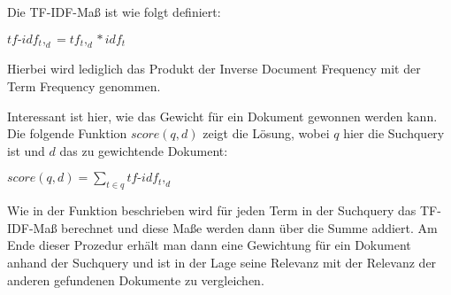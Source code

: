 \begin{defi}[TF-IDF]\label{defi:TF-IDF}
	Die TF-IDF-Maß ist wie folgt definiert:
	\begin{center}
		$tf\text{-}idf_t,_d = tf_t,_d * idf_t$
	\end{center}
	Hierbei wird lediglich das Produkt der Inverse Document Frequency mit der Term Frequency genommen.
\end{defi}

Interessant ist hier, wie das Gewicht für ein Dokument gewonnen werden kann. Die folgende Funktion $score(q,d)$ zeigt die Lösung, wobei $q$ hier die Suchquery ist und $d$ das zu gewichtende Dokument: 
\begin{center}
	$score(q,d)=\sum\limits_{t \in q}tf\text{-}idf_t,_d$
\end{center}
\newpage
Wie in der Funktion beschrieben wird für jeden Term in der Suchquery das TF-IDF-Maß berechnet und diese Maße werden dann über die Summe addiert. Am Ende dieser Prozedur erhält man dann eine Gewichtung für ein Dokument anhand der Suchquery und ist in der Lage seine Relevanz mit der Relevanz der anderen gefundenen Dokumente zu vergleichen.